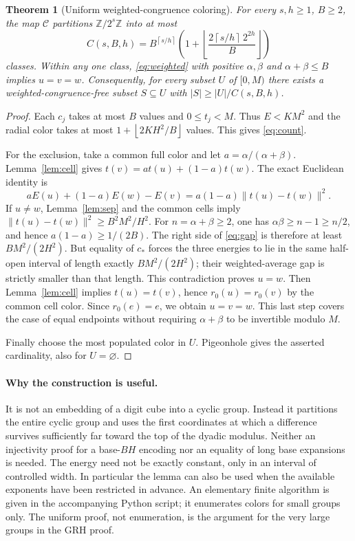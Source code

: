 \documentclass[11pt]{article}
\newtheorem{theorem}{Theorem}[section]
\theoremstyle{remark}\newtheorem{remark}[theorem]{Remark}
\newcommand{\Z}{\mathbb Z}
\newcommand{\floor}[1]{\left\lfloor #1\right\rfloor}
\newcommand{\ceil}[1]{\left\lceil #1\right\rceil}
\begin{document}
\begin{theorem}[Uniform weighted-congruence coloring]\label{thm:color}
For every $s,h\ge1$, $B\ge2$, the map $\mathcal C$ partitions $\Z/2^s\Z$ into at most
\begin{equation}\label{eq:count}
 C(s,B,h)=B^{\ceil{s/h}}\left(1+\floor{\frac{2\ceil{s/h}\,2^{2h}}{B}}\right)
\end{equation}
classes. Within any one class, \eqref{eq:weighted} with positive $\alpha,\beta$ and $\alpha+\beta\le B$ implies $u=v=w$. Consequently, for every subset $U$ of $[0,M)$ there exists a weighted-congruence-free subset $S\subseteq U$ with $|S|\ge|U|/C(s,B,h)$.
\end{theorem}
\begin{proof}
Each $c_j$ takes at most $B$ values and $0\le t_j<M$. Thus $E<KM^2$ and the radial color takes at most $1+\floor{2KH^2/B}$ values. This gives \eqref{eq:count}.

For the exclusion, take a common full color and let $a=\alpha/(\alpha+\beta)$. Lemma~\ref{lem:cell} gives $t(v)=at(u)+(1-a)t(w)$. The exact Euclidean identity is
\begin{equation}\label{eq:gap}
 aE(u)+(1-a)E(w)-E(v)=a(1-a)\|t(u)-t(w)\|^2.
\end{equation}
If $u\ne w$, Lemma~\ref{lem:sep} and the common cells imply
$\|t(u)-t(w)\|^2\ge B^2M^2/H^2$. For $n=\alpha+\beta\ge2$, one has $\alpha\beta\ge n-1\ge n/2$, and hence $a(1-a)\ge1/(2B)$. The right side of \eqref{eq:gap} is therefore at least $BM^2/(2H^2)$. But equality of $c_*$ forces the three energies to lie in the same half-open interval of length exactly $BM^2/(2H^2)$; their weighted-average gap is strictly smaller than that length. This contradiction proves $u=w$. Then Lemma~\ref{lem:cell} implies $t(u)=t(v)$, hence $r_0(u)=r_0(v)$ by the common cell color. Since $r_0(e)=e$, we obtain $u=v=w$. This last step covers the case of equal endpoints without requiring $\alpha+\beta$ to be invertible modulo $M$.

Finally choose the most populated color in $U$. Pigeonhole gives the asserted cardinality, also for $U=\varnothing$.
\end{proof}

\paragraph{Why the construction is useful.} It is not an embedding of a digit cube into a cyclic group. Instead it partitions the entire cyclic group and uses the first coordinates at which a difference survives sufficiently far toward the top of the dyadic modulus. Neither an injectivity proof for a base-$BH$ encoding nor an equality of long base expansions is needed. The energy need not be exactly constant, only in an interval of controlled width. In particular the lemma can also be used when the available exponents have been restricted in advance. An elementary finite algorithm is given in the accompanying Python script; it enumerates colors for small groups only. The uniform proof, not enumeration, is the argument for the very large groups in the GRH proof.
\end{document}
